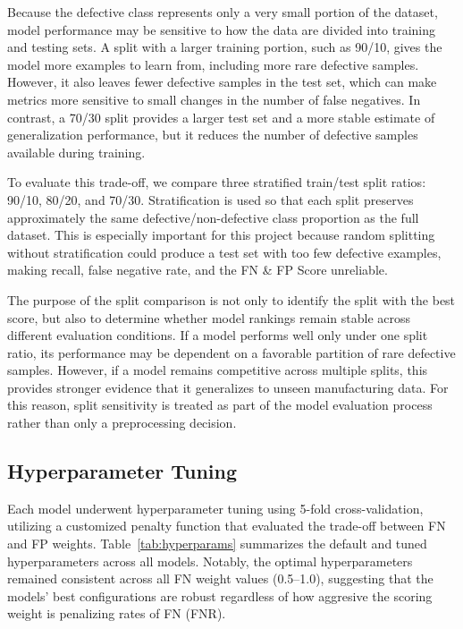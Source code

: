 \documentclass{article}
\begin{document}
Because the defective class represents only a very small portion of the dataset, model performance may be sensitive to how the data are divided into training and testing sets. A split with a larger training portion, such as 90/10, gives the model more examples to learn from, including more rare defective samples. However, it also leaves fewer defective samples in the test set, which can make metrics more sensitive to small changes in the number of false negatives. In contrast, a 70/30 split provides a larger test set and a more stable estimate of generalization performance, but it reduces the number of defective samples available during training.

To evaluate this trade-off, we compare three stratified train/test split ratios: 90/10, 80/20, and 70/30. Stratification is used so that each split preserves approximately the same defective/non-defective class proportion as the full dataset. This is especially important for this project because random splitting without stratification could produce a test set with too few defective examples, making recall, false negative rate, and the FN \& FP Score unreliable.

The purpose of the split comparison is not only to identify the split with the best score, but also to determine whether model rankings remain stable across different evaluation conditions. If a model performs well only under one split ratio, its performance may be dependent on a favorable partition of rare defective samples. However, if a model remains competitive across multiple splits, this provides stronger evidence that it generalizes to unseen manufacturing data. For this reason, split sensitivity is treated as part of the model evaluation process rather than only a preprocessing decision.

\subsection{Hyperparameter Tuning}
Each model underwent hyperparameter tuning using 5-fold cross-validation, utilizing a customized penalty function that evaluated the trade-off between FN and FP weights. Table~\ref{tab:hyperparams} summarizes the default and tuned
hyperparameters across all models. Notably, the optimal hyperparameters remained consistent
across all FN weight values (0.5--1.0), suggesting that the models' best configurations are
robust regardless of how aggresive the scoring weight is penalizing rates of FN (FNR).
\end{document}
